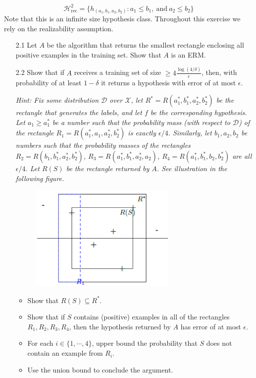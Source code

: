 \documentclass{article}
\begin{document}
\begin{itemize}
	\begin{equation*}
	\mathcal{H}^2_{\mathrm{rec}}=\{h_{(a_1,b_1,a_2,b_2)}:a_1\leq b_1,\ \mathrm{and}\ a_2\leq b_2\}
	\end{equation*}
Note that this is an infinite size hypothesis class. Throughout this exercise we rely on the realizability assumption.

	\begin{itemize}
	\item[2.1] Let $A$ be the algorithm that returns the smallest rectangle enclosing all positive examples in the training set. Show that $A$ is an ERM.
	\item[2.2] Show that if $A$ receives a training set of size $\geq 4\frac{\log(4/\delta)}{\epsilon}$, then, with probability of at least $1-\delta$ it returns a hypothesis with error of at most $\epsilon$.
	
	\textit{Hint: Fix some distribution $\mathcal{D}$ over $\mathcal{X}$, let $R^*=R(a^*_1,b^*_1,a^*_2,b^*_2)$ be the rectangle that generates the labels, and let $f$ be the corresponding hypothesis. Let $a_1\geq a^*_1$ be a number such that the probability mass (with respect to $\mathcal{D}$) of the rectangle $R_1=R(a^*_1,a_1,a^*_2,b^*_2)$ is exactly $\epsilon/4$. Similarly, let $b_1,a_2,b_2$ be numbers such that the probability masses of the rectangles $R_2=R(b_1,b^*_1,a^*_2,b^*_2)$, $R_3=R(a^*_1,b^*_1,a^*_2,a_2)$, $R_4=R(a^*_1,b^*_1,b_2,b^*_2)$ are all $\epsilon/4$. Let $R(S)$ be the rectangle returned by $A$. See illustration in the following figure.}
	
	\begin{figure}[!htbp]
	\center
	\includegraphics[scale=.8]{1.png}
	\end{figure}
	
	\begin{itemize}
	\item Show that $R(S)\subseteq R^*$.
	\item Show that if $S$ contains (positive) examples in all of the rectangles $R_1,R_2,R_3,R_4$, then the hypothesis returned by $A$ has error of at most $\epsilon$.
	\item For each $i\in\{1,\cdots,4\}$, upper bound the probability that $S$ does not contain an example from $R_i$.
	\item Use the union bound to conclude the argument.
	\end{itemize}
	 

\end{itemize}
\end{itemize}
\end{document}
